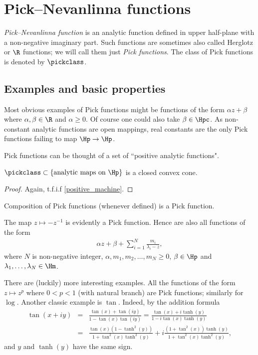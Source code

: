 \chapter{Pick--Nevanlinna functions}

\textit{Pick--Nevanlinna function} is an analytic function defined in upper half-plane with a non-negative imaginary part. Such functions are sometimes also called Herglotz or $\R$ functions; we will call them just \textit{Pick functions}. The class of Pick functions is denoted by $\pickclass$.

\section{Examples and basic properties}

Most obvious examples of Pick functions might be functions of the form $\alpha z + \beta$ where $\alpha, \beta \in \R$ and $\alpha \geq 0$. Of course one could also take $\beta \in \Hpc$. As non-constant analytic functions are open mappings, real constants are the only Pick functions failing to map $\Hp \to \Hp$.

Pick functions can be thought of a set of ``positive analytic functions".

\begin{lause}
	$\pickclass \subset \{\text{analytic maps on $\Hp$} \}$ is a closed convex cone.
\end{lause}
\begin{proof}
	Again, t.f.i.f \ref{positive_machine}.
\end{proof}

Composition of Pick functions (whenever defined) is a Pick function.

The map $z \mapsto -z^{-1}$ is evidently a Pick function. Hence are also all functions of the form
\begin{align*}
	\alpha z + \beta + \sum_{i = 1}^{N} \frac{m_{i}}{\lambda_{i}- z},
\end{align*}
where $N$ is non-negative integer, $\alpha, m_{1}, m_{2}, \ldots, m_{N} \geq 0$, $\beta \in \Hp$ and $\lambda_{1}, \ldots, \lambda_{N} \in \Hm$.

There are (luckily) more interesting examples. All the functions of the form $z \mapsto z^{p}$ where $0 < p < 1$ (with natural branch) are Pick functions; similarly for $\log$. Another classic example is $\tan$. Indeed, by the addition formula
\begin{eqnarray*}
	\tan(x + i y) &=& \frac{\tan(x) + \tan(i y)}{1 - \tan(x) \tan(i y)} = \frac{\tan(x) + i \tanh(y)}{1 - i \tan(x) \tanh(y)} \\
	&=& \frac{\tan(x)(1 - \tanh^2(y))}{1 + \tan^2(x) \tanh^2(y)} + i \frac{(1 + \tan^2(x))\tanh(y)}{1 + \tan^2(x) \tanh^2(y)},
\end{eqnarray*}
and $y$ and $\tanh(y)$ have the same sign.

